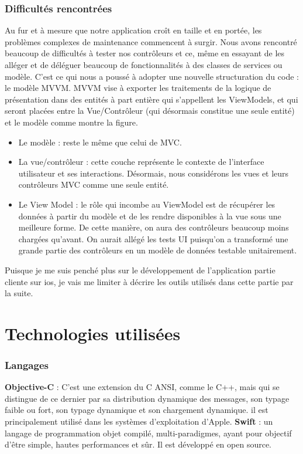 \subsubsection{Difficultés rencontrées} %
 \label{ssub:difficultés_rencontrées_et_pourquoi_mvvm_}
 Au fur et à mesure que notre application croît en taille et en portée, les problèmes complexes de maintenance commencent à surgir. Nous avons rencontré beaucoup de difficultés à tester nos contrôleurs et ce, même en essayant de les alléger et de déléguer beaucoup de fonctionnalités à des classes de services ou modèle. C'est ce qui nous a poussé à adopter une nouvelle structuration du code : le modèle MVVM.\cite{mvvm}\newline
 MVVM vise à exporter les traitements de la logique de présentation dans des entités à part entière qui s'appellent les ViewModels, et qui seront placées entre la Vue/Contrôleur (qui désormais constitue une seule entité) et le modèle comme montre la figure.
 \begin{itemize}
 	\item Le modèle : reste le même que celui de MVC.
 	\item La vue/contrôleur : cette couche représente le contexte de l'interface utilisateur et ses interactions. Désormais, nous considérons les vues et leurs contrôleurs MVC comme une seule entité.
 	\item Le View Model : le rôle qui incombe au ViewModel est de récupérer les données à partir du modèle et de les rendre disponibles à la vue sous une meilleure forme. De cette manière, on aura des contrôleurs beaucoup moins chargées qu'avant. On aurait allégé les tests UI puisqu'on a transformé une grande partie des contrôleurs en un modèle de données testable unitairement.
 \end{itemize}
 Puisque je me suis penché plus sur le développement de l'application partie cliente sur ios, je vais me limiter à décrire les outils utilisés dans cette partie par la suite.

\section{Technologies utilisées} %
\label{sec:technologies_et_outils_utilisés}
\subsubsection{Langages} %
\label{ssub:lanages}
\begin{itemize}
	\itemb \textbf{Objective-C} : C'est une extension du C ANSI, comme le C++, mais qui se distingue de ce dernier par sa distribution dynamique des messages, son typage faible ou fort, son typage dynamique et son chargement dynamique. il est principalement utilisé dans les systèmes d'exploitation d'Apple.
	\itemb \textbf{Swift} : un langage de programmation objet compilé, multi-paradigmes, ayant pour objectif d'être simple, hautes performances et sûr. Il est développé en open source.
\end{itemize}

